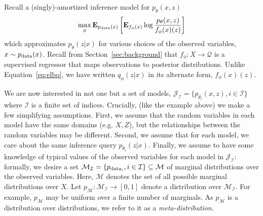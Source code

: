 Recall a (singly)-amortized inference model for $p_\theta(x,z)$
\begin{equation}
\max_{\phi}\mathbf{E}_{p_{\textup{data}}(x)} \left[ \mathbf{E}_{f_\phi(x)} \log \frac{p_\theta(x,z)}{f_\phi(x)(z)} \right]
\end{equation}
which approximates $p_\theta(z|x)$ for various choices of the observed variables, $x \sim p_{\textup{data}}(x)$. Recall from Section~\ref{sec:background} that $f_\phi: X \rightarrow \mathcal{Q}$ is a supervised regressor that maps observations to posterior distributions. Unlike Equation~\ref{eq:elbo}, we have written $q_\phi(z|x)$ in its alternate form, $f_\phi(x)(z)$.

We are now interested in not one but a set of models,
$\mathcal{J}_\mathcal{I} = \{p_{\theta_i}(x,z), i \in \mathcal{I}\}$ where $\mathcal{I}$ is a finite set of indices.  
Crucially, (like the example above) we make a few simplifying assumptions. First, we assume that the random variables in each model have the same domains (e.g. $X,Z$), but the relationships between the random variables may be different.
Second, we assume that for each model, we care about the same inference query $p_{\theta_i}(z|x)$. Finally, we assume to have some knowledge of typical values of the observed variables for each model in $\mathcal{J}_\mathcal{I}$: formally, we desire a set $\mathcal{M}_\mathcal{I} = \{ p_{\textup{data}_i}, i \in \mathcal{I} \} \subseteq \mathcal{M}$ of marginal distributions over the observed variables. 
Here, $\mathcal{M}$ denotes the set of all possible marginal distributions over $X$. Let $p_{\mathcal{M}}: \mathcal{M}_\mathcal{I} \rightarrow [0,1]$ denote a distribution over $\mathcal{M}_\mathcal{I}$. For example, $p_{\mathcal{M}}$ may be uniform over a finite number of marginals. As $p_{\mathcal{M}}$ is a distribution over distributions, we refer to it as a \textit{meta-distribution}.

